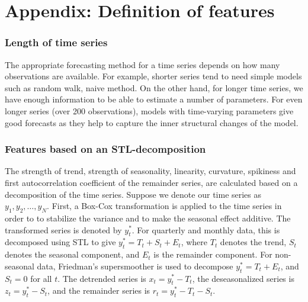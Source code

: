 \documentclass[11pt,a4paper,]{article}
\theoremstyle{definition}
\theoremstyle{definition}
\theoremstyle{definition}
\theoremstyle{remark}
\begin{document}
\newpage

\section*{Appendix: Definition of
features}\label{appendix-definition-of-features}

\subsubsection*{Length of time series}\label{length-of-time-series}

The appropriate forecasting method for a time series depends on how many
observations are available. For example, shorter series tend to need
simple models such as random walk, naive method. On the other hand, for
longer time series, we have enough information to be able to estimate a
number of parameters. For even longer series (over 200 observations),
models with time-varying parameters give good forecasts as they help to
capture the inner structural changes of the model.

\subsubsection*{Features based on an
STL-decomposition}\label{features-based-on-an-stl-decomposition}

The strength of trend, strength of seasonality, linearity, curvature,
spikiness and first autocorrelation coefficient of the remainder series,
are calculated based on a decomposition of the time series. Suppose we
denote our time series as \(y_1, y_2, \dots,y_N\). First, a Box-Cox
transformation is applied to the time series in order to to stabilize
the variance and to make the seasonal effect additive. The transformed
series is denoted by \(y_{t}^*\). For quarterly and monthly data, this
is decomposed using STL \autocite{cleveland1990stl} to give
\(y_t^*=T_t+S_t+E_t\), where \(T_t\) denotes the trend, \(S_t\) denotes
the seasonal component, and \(E_t\) is the remainder component. For
non-seasonal data, Friedman's supersmoother \autocite{supsmu} is used to
decompose \(y_t^*=T_t+E_t\), and \(S_t=0\) for all \(t\). The detrended
series is \(x_t=y_t^*-T_t\), the deseasonalized series is
\(z_t=y_t^*-S_t\), and the remainder series is \(r_t=y_t^*-T_t-S_t\).
\end{document}
